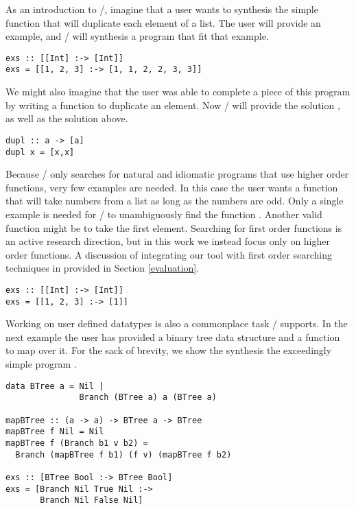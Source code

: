 As an introduction to \ourTool/, imagine that a user wants to synthesis the simple  function that will duplicate each element of a list.
The user will provide an example, and \ourTool/ will synthesis a program  that fit that example.

\begin{lstlisting}
exs :: [[Int] :-> [Int]]
exs = [[1, 2, 3] :-> [1, 1, 2, 2, 3, 3]]
\end{lstlisting}

We might also imagine that the user was able to complete a piece of this program by writing a function  to duplicate an element. Now \ourTool/ will provide the solution , as well as the solution above.

\begin{lstlisting}
dupl :: a -> [a]
dupl x = [x,x]
\end{lstlisting}

Because \ourTool/ only searches for natural and idiomatic programs that use higher order functions, very few examples are needed. In this case the user wants a function that will take numbers from a list as long as the numbers are odd. Only a single example is needed for \ourTool/ to unambiguously find the function . Another valid function might be  to take the first element. Searching for first order functions is an active research direction, but in this work we instead focus only on higher order functions. A discussion of integrating our tool with first order searching techniques in provided in Section \ref{evaluation}.

\begin{lstlisting}
exs :: [[Int] :-> [Int]]
exs = [[1, 2, 3] :-> [1]]
\end{lstlisting}

Working on user defined datatypes is also a commonplace task \ourTool/ supports. In the next example the user has provided a binary tree data structure and a function to map over it. For the sack of brevity, we show the synthesis the exceedingly simple program .

\begin{lstlisting}
data BTree a = Nil |
               Branch (BTree a) a (BTree a)

mapBTree :: (a -> a) -> BTree a -> BTree 
mapBTree f Nil = Nil
mapBTree f (Branch b1 v b2) = 
  Branch (mapBTree f b1) (f v) (mapBTree f b2)

exs :: [BTree Bool :-> BTree Bool]
exs = [Branch Nil True Nil :->
       Branch Nil False Nil]
\end{lstlisting}

